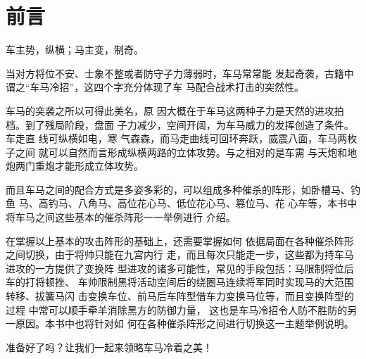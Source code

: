 \chapter*{前言}

车主势，纵横；马主变，制奇。

当对方将位不安、士象不整或者防守子力薄弱时，车马常常能
发起奇袭，古籍中谓之“车马冷招”，这四个字充分体现了车
马配合战术打击的突然性。

车马的突袭之所以可得此美名，原
因大概在于车马这两种子力是天然的进攻拍档。到了残局阶段，盘面
子力减少，空间开阔，为车马威力的发挥创造了条件。车走直
线可纵横如电，寒
气森森，而马走曲线可回环奔跃，威震八面，车马两枚子之间
就可以自然而言形成纵横两路的立体攻势。与之相对的是车需
与天炮和地炮两门重炮才能形成立体攻势。

而且车马之间的配合方式是多姿多彩的，可以组成多种催杀的阵形，如卧槽马、钓鱼
马、高钓马、八角马、高位花心马、低位花心马、篡位马、花
心车等，本书中将车马之间这些基本的催杀阵形一一举例进行
介绍。

在掌握以上基本的攻击阵形的基础上，还需要掌握如何
依据局面在各种催杀阵形之间切换，由于将帅只能在九宫内行
走，而且每次只能走一步，这些都为持车马进攻的一方提供了变换阵
型进攻的诸多可能性，常见的手段包括：马限制将位后车的打将顿挫、
车帅限制黑将活动空间后的绕圈马连续将军同时实现马的大范围转移、拔簧马闪
击变换车位、前马后车阵型借车力变换马位等，而且变换阵型的过程
中常可以顺手牵羊消除黑方的防御力量，
这也是车马冷招令人防不胜防的另一原因。本书中也将针对如
何在各种催杀阵形之间进行切换这一主题举例说明。

准备好了吗？让我们一起来领略车马冷着之美！


